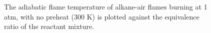 \begin{figure}

\centering



\caption[- alkane-air flame results - II]{The adiabatic flame temperature of alkane-air flames burning at 1 atm, with no preheat (300 K) is plotted against the equivalence ratio of the reactant mixture.}

\label{fig:c1c3-t}

\end{figure}
